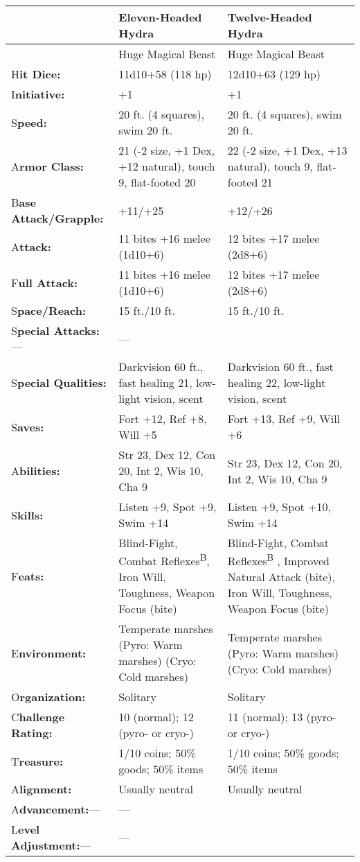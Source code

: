 \documentclass{article}
\begin{document}
\vspace{12pt}
\begin{tabular}{|>{\raggedright}p{54pt}|>{\raggedright}p{130pt}|>{\raggedright}p{130pt}|}
\hline
  & E\textbf{leven-Headed Hydra} & T\textbf{welve-Headed Hydra}\tabularnewline
\hline
  & Huge Magical Beast & Huge Magical Beast\tabularnewline
\hline
H\textbf{it Dice:} & 11d10+58 (118 hp) & 12d10+63 (129 hp)\tabularnewline
\hline
I\textbf{nitiative:} & +1 & +1\tabularnewline
\hline
S\textbf{peed:} & 20 ft. (4 squares), swim 20 ft. & 20 ft. (4 squares), swim 20 
ft.\tabularnewline
\hline
A\textbf{rmor Class:} & 21 (-2 size, +1 Dex, +12 natural), touch 9, flat-footed 
20 & 22 (-2 size, +1 Dex, +13 natural), touch 9, flat-footed 21\tabularnewline
\hline
B\textbf{ase Attack/Grapple:} & +11/+25 & +12/+26\tabularnewline
\hline
A\textbf{ttack:} & 11 bites +16 melee (1d10+6) & 12 bites +17 melee (2d8+6)\tabularnewline
\hline
F\textbf{ull Attack:} & 11 bites +16 melee (1d10+6) & 12 bites +17 melee (2d8+6)\tabularnewline
\hline
S\textbf{pace/Reach:} & 15 ft./10 ft. & 15 ft./10 ft.\tabularnewline
\hline
S\textbf{pecial Attacks:}--- & --- & \tabularnewline
\hline
S\textbf{pecial Qualities:} & Darkvision 60 ft., fast healing 21, low-light vision, 
scent & Darkvision 60 ft., fast healing 22, low-light vision, scent\tabularnewline
\hline
S\textbf{aves:} & Fort +12, Ref +8, Will +5 & Fort +13, Ref +9, Will +6\tabularnewline
\hline
A\textbf{bilities:} & Str 23, Dex 12, Con 20, Int 2, Wis 10, Cha 9 & Str 23, Dex 
12, Con 20, Int 2, Wis 10, Cha 9\tabularnewline
\hline
S\textbf{kills:} & Listen +9, Spot +9, Swim +14 & Listen +9, Spot +10, Swim +14\tabularnewline
\hline
F\textbf{eats:} & Blind-Fight, Combat Reflexes\textsuperscript{B}, Iron Will, Toughness, 
Weapon Focus (bite) & Blind-Fight, Combat Reflexes\textsuperscript{B}{\scriptsize{} 
}, Improved Natural Attack (bite), Iron Will, Toughness, Weapon Focus (bite)\tabularnewline
\hline
E\textbf{nvironment:} & Temperate marshes \linebreak{}
(Pyro: Warm marshes) \linebreak{}
(Cryo: Cold marshes) & Temperate marshes \linebreak{}
(Pyro: Warm marshes) \linebreak{}
(Cryo: Cold marshes)\tabularnewline
\hline
O\textbf{rganization:} & Solitary & Solitary\tabularnewline
\hline
C\textbf{hallenge Rating:} & 10 (normal); \linebreak{}
12 (pyro- or cryo-) & 11 (normal); \linebreak{}
13 (pyro- or cryo-)\tabularnewline
\hline
T\textbf{reasure:} & 1/10 coins; 50\% goods; 50\% items & 1/10 coins; 50\% goods; 
50\% items\tabularnewline
\hline
A\textbf{lignment:} & Usually neutral & Usually neutral\tabularnewline
\hline
A\textbf{dvancement:}--- & --- & \tabularnewline
\hline
L\textbf{evel Adjustment:}--- & --- & \tabularnewline
\hline
\end{tabular}
\end{document}
